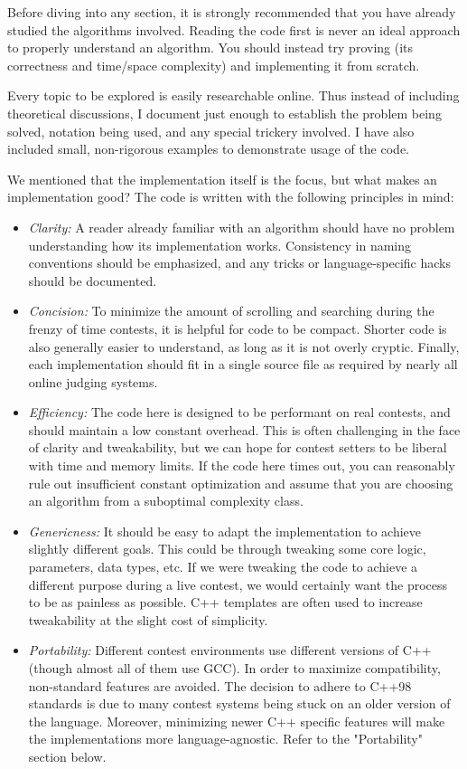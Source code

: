 \documentclass[11pt,letterpaper,twoside]{book}
\begin{document}
Before diving into any section, it is strongly recommended that you have already studied the algorithms involved. Reading the code first is never an ideal approach to properly understand an algorithm. You should instead try proving (its correctness and time/space complexity) and implementing it from scratch.

Every topic to be explored is easily researchable online. Thus instead of including theoretical discussions, I document just enough to establish the problem being solved, notation being used, and any special trickery involved. I have also included small, non-rigorous examples to demonstrate usage of the code.

We mentioned that the implementation itself is the focus, but what makes an implementation good? The code is written with the following principles in mind:
\begin{itemize}
	\item \textit{Clarity:} A reader already familiar with an algorithm should have no problem understanding how its implementation works. Consistency in naming conventions should be emphasized, and any tricks or language-specific hacks should be documented.
	\item \textit{Concision:} To minimize the amount of scrolling and searching during the frenzy of time contests, it is helpful for code to be compact. Shorter code is also generally easier to understand, as long as it is not overly cryptic. Finally, each implementation should fit in a single source file as required by nearly all online judging systems.
	\item \textit{Efficiency:} The code here is designed to be performant on real contests, and should maintain a low constant overhead. This is often challenging in the face of clarity and tweakability, but we can hope for contest setters to be liberal with time and memory limits. If the code here times out, you can reasonably rule out insufficient constant optimization and assume that you are choosing an algorithm from a suboptimal complexity class.
	\item \textit{Genericness:} It should be easy to adapt the implementation to achieve slightly different goals. This could be through tweaking some core logic, parameters, data types, etc. If we were tweaking the code to achieve a different purpose during a live contest, we would certainly want the process to be as painless as possible. C++ templates are often used to increase tweakability at the slight cost of simplicity.
	\item \textit{Portability:} Different contest environments use different versions of C++ (though almost all of them use GCC). In order to maximize compatibility, non-standard features are avoided. The decision to adhere to C++98 standards is due to many contest systems being stuck on an older version of the language. Moreover, minimizing newer C++ specific features will make the implementations more language-agnostic. Refer to the "Portability" section below.
\end{itemize}
\end{document}
